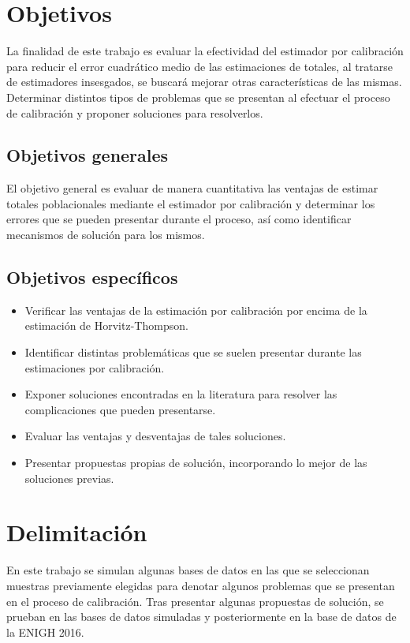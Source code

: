 \documentclass[a4paper,twoside,openright,12pt]{book}
\theoremstyle{definition}
\numberwithin{equation}{chapter}
\numberwithin{figure}{chapter}
\numberwithin{table}{chapter}
\numberwithin{theorem}{chapter}
\numberwithin{lemma}{chapter}
\begin{document}
\section*{Objetivos}%
La finalidad de este trabajo es evaluar la efectividad del estimador por calibración para reducir el error cuadrático medio de las estimaciones de totales, al tratarse de estimadores insesgados, se buscará mejorar otras características de las mismas. Determinar distintos tipos de problemas que se presentan al efectuar el proceso de calibración y proponer soluciones para resolverlos.
\subsection*{Objetivos generales}
El objetivo general es evaluar de manera cuantitativa las ventajas de estimar totales poblacionales mediante el estimador por calibración y determinar los errores que se pueden presentar durante el proceso, así como identificar mecanismos de solución para los mismos.
\subsection*{Objetivos específicos}
\begin{itemize}
	\item Verificar las ventajas de la estimación por calibración por encima de la estimación de Horvitz-Thompson.
	\item Identificar distintas problemáticas que se suelen presentar durante las estimaciones por calibración.
	\item Exponer soluciones encontradas en la literatura para resolver las complicaciones que pueden presentarse.
	\item Evaluar las ventajas y desventajas de tales soluciones.
	\item Presentar propuestas propias de solución, incorporando lo mejor de las soluciones previas.
\end{itemize}
\section*{Delimitación}
En este trabajo se simulan algunas bases de datos en las que se seleccionan muestras previamente elegidas para denotar algunos problemas que se presentan en el proceso de calibración. Tras presentar algunas propuestas de solución, se prueban en las bases de datos simuladas y posteriormente en la base de datos de la ENIGH 2016.
\end{document}
